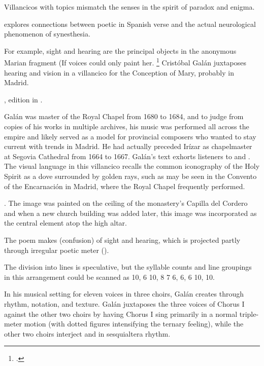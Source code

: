 Villancicos with  topics mismatch the senses in the spirit
of paradox and enigma.%
\begin{Footnote}
    \Autocite{DoetschKraus:Sinestesia} explores connections between poetic
     in Spanish verse and the actual
    neurological phenomenon of synesthesia.  
\end{Footnote}
For example, sight and hearing are the principal objects in the anonymous
Marian fragment  (If voices
could only paint her.%
    \footnote{.}
Cristóbal Galán juxtaposes hearing and vision in a villancico for the Conception
of Mary, probably in Madrid.%
\begin{Footnote}
    , edition in \autocite[567--568]{CaberoPueyo:PhD}.
\end{Footnote}
Galán was master of the Royal Chapel from 1680 to 1684, and to judge from copies
of his works in multiple archives, his music was performed all across the
empire and likely served as a model for provincial composers who wanted to stay
current with trends in Madrid.
He had actually preceded Irízar as chapelmaster at Segovia Cathedral from 1664
to 1667.%
    \Autocite{Baron-Sage:GalanC}
Galán's text exhorts listeners to  and .
The visual language in this villancico recalls the common iconography of the
Holy Spirit as a dove surrounded by golden rays, such as may be seen in the
Convento of the Encarnación in Madrid, where the Royal Chapel frequently
performed.%
\begin{Footnote}
    \Autocite[69--70, 81]{Sanz:GuiaDescalzasEncarnacion}.
    The image was painted on the ceiling of the monastery's Capilla del Cordero
    and when a new church building was added later, this image was incorporated
    as the central element atop the high altar.
\end{Footnote}
The poem makes  (confusion) of sight and hearing, which is
projected partly through irregular poetic meter
().%
\begin{Footnote}
    The division into lines is speculative, but the syllable counts and line
    groupings in this arrangement could be scanned as  10, 6 10, 8 7 6, 6, 6 10,
    10.
\end{Footnote}
In his musical setting for eleven voices in three choirs, Galán creates
 through rhythm, notation, and texture.  
Galán juxtaposes the three voices of Chorus I against the other two choirs by
having Chorus I sing primarily in a normal triple-meter motion (with dotted
figures intensifying the ternary feeling), while the other two choirs interject
 and  in sesquialtera rhythm.


